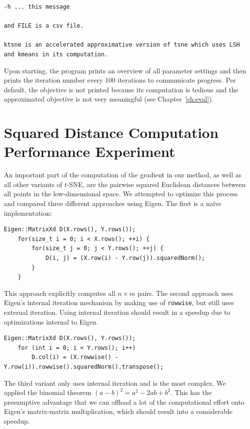 \begin{appendix}
\begin{lstlisting}[breaklines,postbreak=\mbox{\textcolor{red}{$\hookrightarrow$}\space}, basicstyle=\ttfamily,caption={Helptext of our implementation}]
  -h ... this message

and FILE is a csv file.

ktsne is an accelerated approximative version of tsne which uses LSH and kmeans in its computation.
\end{lstlisting}

Upon starting, the program prints an overview of all parameter settings and then prints the
iteration number every 100 iterations to communicate progress. Per default, the objective is
not printed because its computation is tedious and the approximated objective is not very meaningful
(see Chapter~\ref{ch:eval}).

\chapter{Squared Distance Computation Performance Experiment}\label{ap:b}

An important part of the computation of the gradient in our method, as well as
all other variants of $t$-SNE, are the pairwise squared Euclidean distances between
all points in the low-dimensional space. We attempted to optimize this process
and compared three different approaches using Eigen. The first is a na\"ive implementation:

\begin{lstlisting}[breaklines,postbreak=\mbox{\textcolor{red}{$\hookrightarrow$}\space}, basicstyle=\ttfamily,caption={Na\"ive approach}]
    Eigen::MatrixXd D(X.rows(), Y.rows());
    for(size_t i = 0; i < X.rows(); ++i) {
        for(size_t j = 0; j < Y.rows(); ++j) {
            D(i, j) = (X.row(i) - Y.row(j)).squaredNorm();
        }
    }
\end{lstlisting}

This approach explicitly computes all $n \times m$ pairs. The second approach uses Eigen's
internal iteration mechanism by making use of \texttt{rowwise}, but still uses external iteration.
Using internal iteration should result in a speedup due to optimizations internal to Eigen.

\begin{lstlisting}[breaklines,postbreak=\mbox{\textcolor{red}{$\hookrightarrow$}\space}, basicstyle=\ttfamily,caption={Rowwise approach}]
    Eigen::MatrixXd D(X.rows(), Y.rows());
    for (int i = 0; i < Y.rows(); i++)
        D.col(i) = (X.rowwise() - Y.row(i)).rowwise().squaredNorm().transpose();
\end{lstlisting}

The third variant only uses internal iteration and is the most complex. We applied the binomial
theorem $(a - b)^2 = a^2 - 2ab + b^2$. This has the presumptive advantage that we can offload
a lot of the computational effort onto Eigen's matrix-matrix multiplication, which should result
into a considerable speedup.


\end{appendix}
